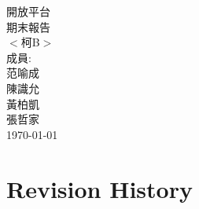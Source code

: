 \documentclass{scrreprt}
\date{}
\begin{document}
\begin{CJK}{UTF8}{bkai}
\begin{center}
    \begin{bfseries}
        \Huge{開放平台\\期末報告}\\
        \vspace{3.8cm}
        $<$柯B$>$\\
        \vspace{1.9cm}
        \LARGE{成員:}\\
        \vspace{1.0cm}
        范喻成\\
        \vspace{0.5cm}
        陳識允\\
        \vspace{0.5cm}
        黃柏凱\\
        \vspace{0.5cm}
        張哲家\\
        \vspace{0.5cm}
        \today\\
    \end{bfseries}
\end{center}

\tableofcontents

\chapter*{Revision History}


\end{CJK}
\end{document}
